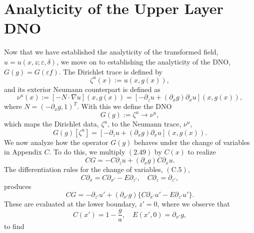 \section{Analyticity of the Upper Layer DNO}
\label{intro:analyticity of dno}

Now that we have established the analyticity of the transformed field, $u=u(x,z;\varepsilon,\delta)$, we move on to establishing the analyticity of the DNO, $G(g)=G(\varepsilon f)$. The Dirichlet trace is defined by
$$\zeta^u(x) := u(x,g(x)),$$
and its exterior Neumann counterpart is defined as
\begin{equation}\nu^u(x) := [-N\cdot \nabla u](x,g(x)) = [-\partial_z u + (\partial_x g) \partial_x u](x,g(x)),\end{equation}
where $N=(-\partial_x g,1)^T$. With this we define the DNO
\begin{equation} G(g):= \zeta^u \to \nu^u,\end{equation}
which maps the Dirichlet data, $\zeta^u$, to the Neumann trace, $\nu^u$,
\begin{equation}G(g)[\zeta^u]= [-\partial_z u + (\partial_x g) \partial_x u](x,g(x)).\end{equation}
We now analyze how the operator $G(g)$ behaves under the change of variables in Appendix $C$. To do this, we multiply $(2.49)$ by $C(x)$ to realize
$$CG = -C\partial_z u + (\partial_x g) C\partial_x u.$$
The differentiation rules for the change of variables, $(\text{C}.5)$,
$$C\partial_x = C\partial_{x'}-E\partial_{z'},\quad C\partial_z = \partial_{z'},$$
produces
$$CG = -\partial_{z'}u'+(\partial_{x'} g)\{C\partial_{x'} u' - E\partial_{z'} u'\}.$$
These are evaluated at the lower boundary, $z'=0$, where we observe that
$$C(x')=1-\frac{g}{a},\quad E(x',0)=\partial_{x'}g,$$
to find

